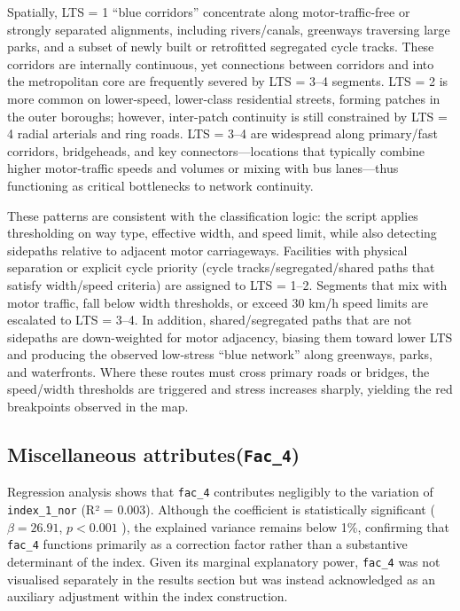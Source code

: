\documentclass[
  12pt,
  oneside]{book}
\begin{document}
Spatially, LTS = 1 ``blue corridors'' concentrate along motor-traffic-free or strongly separated alignments, including rivers/canals, greenways traversing large parks, and a subset of newly built or retrofitted segregated cycle tracks. These corridors are internally continuous, yet connections between corridors and into the metropolitan core are frequently severed by LTS = 3--4 segments. LTS = 2 is more common on lower-speed, lower-class residential streets, forming patches in the outer boroughs; however, inter-patch continuity is still constrained by LTS = 4 radial arterials and ring roads. LTS = 3--4 are widespread along primary/fast corridors, bridgeheads, and key connectors---locations that typically combine higher motor-traffic speeds and volumes or mixing with bus lanes---thus functioning as critical bottlenecks to network continuity.

These patterns are consistent with the classification logic: the script applies thresholding on way type, effective width, and speed limit, while also detecting sidepaths relative to adjacent motor carriageways. Facilities with physical separation or explicit cycle priority (cycle tracks/segregated/shared paths that satisfy width/speed criteria) are assigned to LTS = 1--2. Segments that mix with motor traffic, fall below width thresholds, or exceed 30 km/h speed limits are escalated to LTS = 3--4. In addition, shared/segregated paths that are not sidepaths are down-weighted for motor adjacency, biasing them toward lower LTS and producing the observed low-stress ``blue network'' along greenways, parks, and waterfronts. Where these routes must cross primary roads or bridges, the speed/width thresholds are triggered and stress increases sharply, yielding the red breakpoints observed in the map.

\subsection{\texorpdfstring{Miscellaneous attributes(\texttt{Fac\_4})}{Miscellaneous attributes(Fac\_4)}}\label{miscellaneous-attributesfac_4}

Regression analysis shows that \texttt{fac\_4} contributes negligibly to the variation of \texttt{index\_1\_nor} (R² = 0.003). Although the coefficient is statistically significant ( \(\beta = 26.91\), \(p < 0.001\) ), the explained variance remains below 1\%, confirming that \texttt{fac\_4} functions primarily as a correction factor rather than a substantive determinant of the index. Given its marginal explanatory power, \texttt{fac\_4} was not visualised separately in the results section but was instead acknowledged as an auxiliary adjustment within the index construction.
\end{document}
